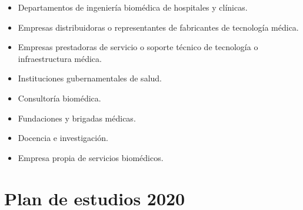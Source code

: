\documentclass[10pt,letterpaper]{article}
\begin{document}
\begin{itemize}
  \item Departamentos de ingeniería biomédica de hospitales y clínicas.
  \item Empresas distribuidoras o representantes de fabricantes de tecnología médica.
  \item Empresas prestadoras de servicio o soporte técnico de tecnología o infraestructura médica.
  \item Instituciones gubernamentales de salud.
  \item Consultoría biomédica.
  \item Fundaciones y brigadas médicas.
  \item Docencia e investigación.
  \item Empresa propia de servicios biomédicos.
\end{itemize}

\clearpage
\section*{Plan de estudios 2020}
\end{document}
